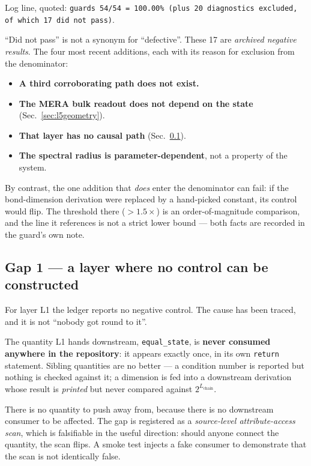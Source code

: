 \documentclass[11pt,a4paper]{article}
\newcommand{\code}[1]{\texttt{\small #1}}
\begin{document}
\noindent Log line, quoted: \code{guards 54/54 = 100.00\% (plus 20 diagnostics
excluded, of which 17 did not pass)}.

``Did not pass'' is not a synonym for ``defective''. These 17 are \emph{archived
negative results}. The four most recent additions, each with its reason for
exclusion from the denominator:

\begin{itemize}[leftmargin=1.4em,itemsep=3pt]
  \item \textbf{A third corroborating path does not exist.}
  \item \textbf{The MERA bulk readout does not depend on the state}
        (Sec.~\ref{sec:l5geometry}).
  \item \textbf{That layer has no causal path} (Sec.~\ref{sec:l1gap}).
  \item \textbf{The spectral radius is parameter-dependent}, not a property of the
        system.
\end{itemize}

\noindent By contrast, the one addition that \emph{does} enter the denominator can
fail: if the bond-dimension derivation were replaced by a hand-picked constant, its
control would flip. The threshold there ($>1.5\times$) is an order-of-magnitude
comparison, and the line it references is not a strict lower bound --- both facts
are recorded in the guard's own note.

\subsection{Gap 1 --- a layer where no control can be constructed}
\label{sec:l1gap}

For layer L1 the ledger reports no negative control. The cause has been traced, and
it is not ``nobody got round to it''.

The quantity L1 hands downstream, \code{equal\_state}, is \textbf{never consumed
anywhere in the repository}: it appears exactly once, in its own \code{return}
statement. Sibling quantities are no better --- a condition number is reported but
nothing is checked against it; a dimension is fed into a downstream derivation whose
result is \emph{printed} but never compared against $2^{L_{\text{chain}}}$.

There is no quantity to push away from, because there is no downstream consumer to
be affected. The gap is registered as a \emph{source-level attribute-access scan},
which is falsifiable in the useful direction: should anyone connect the quantity, the
scan flips. A smoke test injects a fake consumer to demonstrate that the scan is not
identically false.
\end{document}
